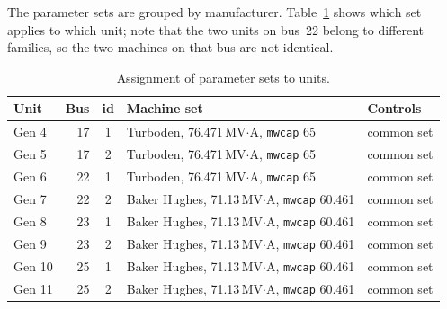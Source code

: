 The parameter sets are grouped by manufacturer. Table~\ref{tab:assign} shows which
set applies to which unit; note that the two units on bus~22 belong to different
families, so the two machines on that bus are not identical.

\begin{table}[!ht]
\centering
\begin{tabularx}{\linewidth}{@{}l r c X l@{}}
\toprule
\textbf{Unit} & \multicolumn{1}{c}{\textbf{Bus}} & \multicolumn{1}{c}{\textbf{id}} & \textbf{Machine set} & \textbf{Controls} \\
\midrule
Gen 4  & 17 & 1 & Turboden, 76.471\,MV$\cdot$A, \texttt{mwcap} 65      & common set \\
Gen 5  & 17 & 2 & Turboden, 76.471\,MV$\cdot$A, \texttt{mwcap} 65      & common set \\
Gen 6  & 22 & 1 & Turboden, 76.471\,MV$\cdot$A, \texttt{mwcap} 65      & common set \\
Gen 7  & 22 & 2 & Baker Hughes, 71.13\,MV$\cdot$A, \texttt{mwcap} 60.461 & common set \\
Gen 8  & 23 & 1 & Baker Hughes, 71.13\,MV$\cdot$A, \texttt{mwcap} 60.461 & common set \\
Gen 9  & 23 & 2 & Baker Hughes, 71.13\,MV$\cdot$A, \texttt{mwcap} 60.461 & common set \\
Gen 10 & 25 & 1 & Baker Hughes, 71.13\,MV$\cdot$A, \texttt{mwcap} 60.461 & common set \\
Gen 11 & 25 & 2 & Baker Hughes, 71.13\,MV$\cdot$A, \texttt{mwcap} 60.461 & common set \\
\bottomrule
\end{tabularx}
\caption{Assignment of parameter sets to units.}
\label{tab:assign}
\end{table}
